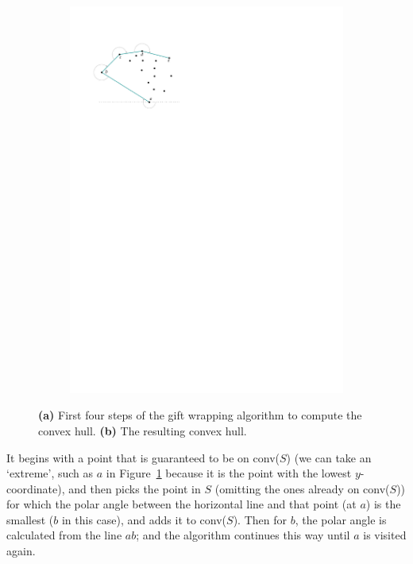 \begin{figure}
\begin{subfigure}[b]{0.3\linewidth}
    \includegraphics[page=2,width=\textwidth]{figs/giftwrapping.pdf}
    \caption{}
  \end{subfigure}
  \caption{\textbf{(a)} First four steps of the gift wrapping algorithm to compute the convex hull. \textbf{(b)} The resulting convex hull.}
\label{fig:giftwrapping}
\end{figure}
It begins with a point that is guaranteed to be on conv($S$) (we can take an `extreme', such as $a$ in Figure~\ref{fig:giftwrapping} because it is the point with the lowest $y$-coordinate), and then picks the point in $S$ (omitting the ones already on conv($S$)) for which the polar angle between the horizontal line and that point (at $a$) is the smallest ($b$ in this case), and adds it to conv($S$).
Then for $b$, the polar angle is calculated from the line $ab$; and the algorithm continues this way until $a$ is visited again.

